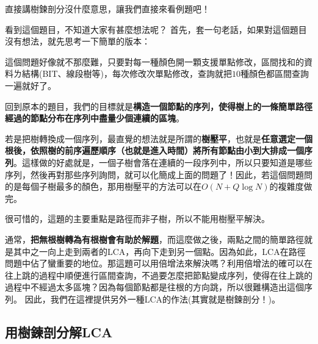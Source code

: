 \documentclass[main.tex]{subfiles}
\begin{document}
	直接講樹鍊剖分沒什麼意思，讓我們直接來看例題吧！
	
	看到這個題目，不知道大家有甚麼想法呢？
	首先，套一句老話，如果對這個題目沒有想法，就先思考一下簡單的版本：

	這個問題好像就不那麼難，只要對每一種顏色開一顆支援單點修改，區間找和的資料ㄌ結構(BIT、線段樹等)，每次修改次單點修改，查詢就把$10$種顏色都區間查詢一遍就好了。
	
	回到原本的題目，我們的目標就是\textbf{構造一個節點的序列，使得樹上的一條簡單路徑經過的節點分布在序列中盡量少個連續的區塊}。
	
	若是把樹轉換成一個序列，最直覺的想法就是所謂的\textbf{樹壓平}，也就是\textbf{任意選定一個根後，依照樹的前序遍歷順序（也就是進入時間）將所有節點由小到大排成一個序列}。這樣做的好處就是，一個子樹會落在連續的一段序列中，所以只要知道是哪些序列，然後再對那些序列詢問，就可以化簡成上面的問題了！因此，若這個問題問的是每個子樹最多的顏色，那用樹壓平的方法可以在$O(N+Q\log N)$的複雜度做完。
	
	很可惜的，這題的主要重點是路徑而非子樹，所以不能用樹壓平解決。
	
	通常，\textbf{把無根樹轉為有根樹會有助於解題}，而這麼做之後，兩點之間的簡單路徑就是其中之一向上走到兩者的LCA，再向下走到另一個點。因為如此，LCA在路徑問題中佔了蠻重要的地位。那這題可以用倍增法來解決嗎？利用倍增法的確可以在往上跳的過程中順便進行區間查詢，不過要怎麼把節點變成序列，使得在往上跳的過程中不經過太多區塊？因為每個節點都是往根的方向跳，所以很難構造出這個序列。
	因此，我們在這裡提供另外一種LCA的作法(其實就是樹鍊剖分！)。
	\subsection{用樹鍊剖分解LCA}
	
\end{document}
